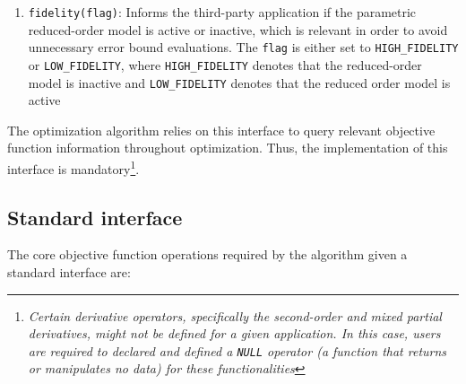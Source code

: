 \begin{enumerate}
    \item \texttt{fidelity(flag)}: Informs the third-party application if the parametric reduced-order model is active or inactive, which is relevant in order to avoid unnecessary error bound evaluations. The \texttt{flag} is either set to \texttt{HIGH\_FIDELITY} or \texttt{LOW\_FIDELITY}, where \texttt{HIGH\_FIDELITY} denotes that the reduced-order model is inactive and \texttt{LOW\_FIDELITY} denotes that the reduced order model is active
    \end{enumerate}
    
    The optimization algorithm relies on this interface to query relevant objective function information throughout optimization. Thus, the implementation of this interface is mandatory\footnote{\emph{Certain derivative operators, specifically the second-order and mixed partial derivatives, might not be defined for a given application. In this case, users are required to declared and defined a \texttt{NULL} operator (a function that returns or manipulates no data) for these functionalities}}.
    
    \subsection{Standard interface}\label{subsec:ObjectiveStandardAPI}
    
    The core objective function operations required by the algorithm given a standard interface are: 
    
